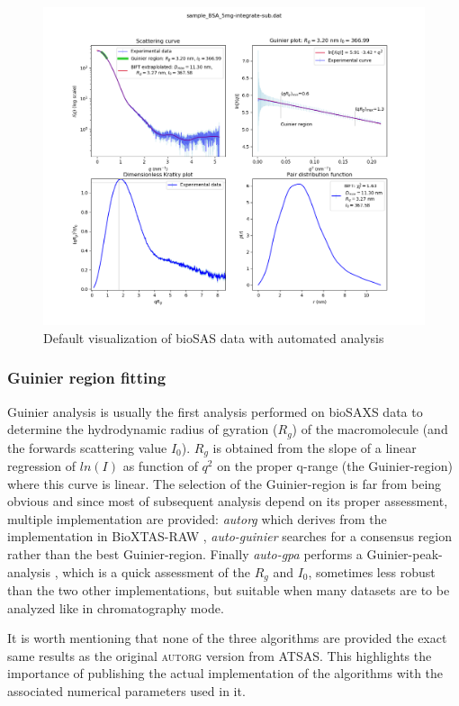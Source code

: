 \documentclass[preprint]{iucr}              %
\begin{document}
\begin{figure}
\label{plot}
\begin{center}
\includegraphics[width=12cm]{Figure_1.png}
\caption{Default visualization of bioSAS data with automated analysis}
\end{center}
\end{figure}


\subsubsection{Guinier region fitting}
Guinier analysis \cite{guinier} is usually the first analysis performed on bioSAXS data to determine the hydrodynamic radius of gyration ($R_g$) of the macromolecule (and the forwards scattering value $I_0$).
$R_g$ is obtained from the slope of a linear regression of $ln(I)$ as function of $q^2$ on the proper q-range (the Guinier-region) where this curve is linear.
The selection of the Guinier-region is far from being obvious and since most of subsequent analysis depend on its  proper assessment, 
multiple implementation are provided: \textit{autorg} which derives from the implementation in BioXTAS-RAW \cite{bioxtasraw}, \textit{auto-guinier} searches for a consensus region rather than the best Guinier-region. 
Finally \textit{auto-gpa} performs a Guinier-peak-analysis \cite{gpa}, 
which is a quick assessment of the $R_g$ and $I_0$, sometimes less robust than the two other implementations, but suitable when many datasets are to be analyzed like in chromatography mode.

It is worth mentioning that none of the three algorithms are provided the exact same results as the original \textsc{autorg} \cite{ATSAS2} version from ATSAS. 
This highlights the importance of publishing the actual implementation of the algorithms with the associated numerical parameters used in it.
  
\end{document}
